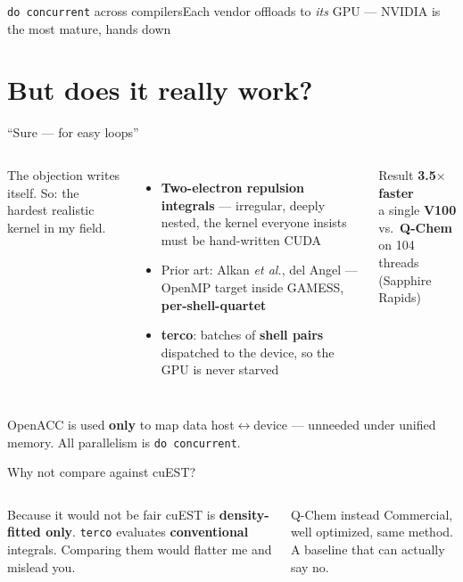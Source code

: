 \documentclass[aspectratio=169]{beamer}
\begin{document}
\begin{frame}{\texttt{do concurrent} across compilers}{Each vendor offloads to \emph{its} GPU --- NVIDIA is the most mature, hands down}
  \centering
  \scalebox{0.86}{}
\end{frame}

\section{But does it really work?}

\begin{frame}{``Sure --- for easy loops''}
  \begin{columns}[T,onlytextwidth]
      The objection writes itself. So: the hardest realistic kernel in my field.
      \begin{itemize}
        \item \textbf{Two-electron repulsion integrals} --- irregular, deeply nested,
          the kernel everyone insists must be hand-written CUDA
        \item Prior art: Alkan \emph{et al.}, del Angel --- OpenMP target inside GAMESS,
          \textbf{per-shell-quartet}
        \item \textbf{terco}: batches of \textbf{shell pairs} dispatched to the device,
          so the GPU is never starved
      \end{itemize}
      \begin{exampleblock}{Result}
        \centering
        {\Large\textbf{3.5$\times$ faster}}\\[.35em]
        {\footnotesize a single \textbf{V100} \\ vs.\ \textbf{Q-Chem} on 104 threads (Sapphire Rapids)}
      \end{exampleblock}
  \end{columns}
  \vspace{.2em}
  {\footnotesize OpenACC is used \textbf{only} to map data host$\leftrightarrow$device --- unneeded under unified memory.
  All parallelism is \texttt{do concurrent}.}
\end{frame}

\begin{frame}{Why not compare against cuEST?}
  \begin{columns}[T,onlytextwidth]
      \begin{alertblock}{Because it would not be fair}
        cuEST is \textbf{density-fitted only}. \texttt{terco} evaluates
        \textbf{conventional} integrals. Comparing them would flatter me and
        mislead you.
      \end{alertblock}
      \begin{block}{Q-Chem instead}
        Commercial, well optimized, same method. A baseline that can actually
        say no.
      \end{block}
  \end{columns}
\end{frame}
\end{document}
